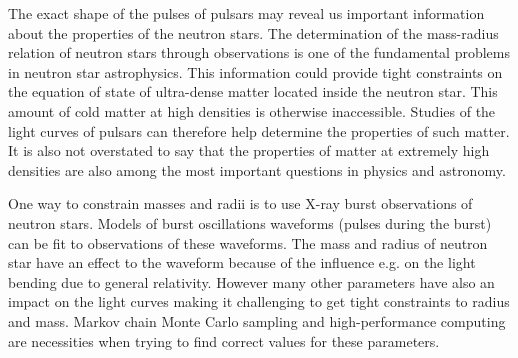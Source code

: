 \documentclass{wihuri}
\begin{document}
The exact shape of the pulses of pulsars may reveal us important information about the properties of the neutron stars. The determination of the mass-radius relation of neutron stars through observations is one of the fundamental problems in neutron star astrophysics. This information could provide tight constraints on the equation of state of ultra-dense matter located inside the neutron star. This amount of cold matter at high densities is otherwise inaccessible. Studies of the light curves of pulsars can therefore help determine the properties of such matter. It is also not overstated to say that the properties of matter at extremely high densities are also among the most important questions in physics and astronomy. 


One way to constrain masses and radii is to use X-ray burst observations of neutron stars. Models of burst oscillations waveforms (pulses during the burst) can be fit to observations of these waveforms. The mass and radius of neutron star have an effect to the waveform because of the influence e.g. on the light bending due to general relativity. However many other parameters have also an impact on the light curves making it challenging to get tight constraints to radius and mass. Markov chain Monte Carlo sampling and high-performance computing are necessities when trying to find correct values for these parameters. 








\vspace{10cm}











\iffalse 
\end{document}
